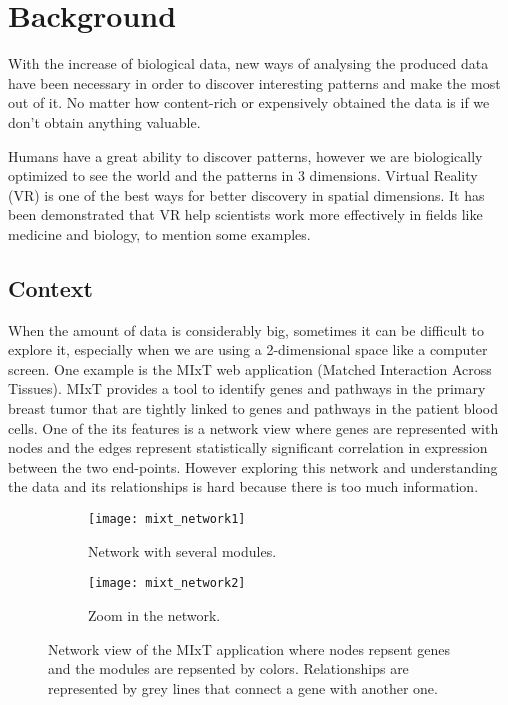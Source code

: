 \section{Background}
With the increase of biological data, new ways of analysing the produced data have been necessary in order to discover interesting patterns  and make the most out of it. No matter how content-rich or expensively obtained the data is if we don’t obtain anything valuable.

Humans have a great ability to discover patterns, however we are biologically optimized to see the world and the patterns in 3 dimensions. Virtual Reality (VR) is one of the best ways for better discovery in spatial dimensions. It has been demonstrated that VR help scientists work more effectively in fields like medicine \cite{Laver11}\cite{xia_ip_samman_wong_gateno_wang_yeung_kot_tideman_2001} and biology\cite{10.1093/bioinformatics/bti581}, to mention some examples.

\subsection{Context}
When the amount of data is considerably big, sometimes it can be difficult to explore it, especially when we are using a 2-dimensional space like a computer screen. One example is the MIxT web application (Matched Interaction Across Tissues)\cite{fjukstad_dumeaux_olsen_lund_hallett_bongo_2017}\cite{dumeaux_fjukstad_interactions_tumor_blood}. MIxT provides a tool to identify genes and pathways in the primary breast tumor that are tightly linked to genes and pathways in the patient blood cells\cite{dumeaux_fjukstad_interactions_tumor_blood}. One of the its features is a network view where genes are represented with nodes and the edges represent statistically significant correlation in expression between the two end-points. However exploring this network and understanding the data and its relationships is hard because there is too much information.

\begin{figure}[h!]
    \newlength{\tempheight}
    \setlength{\tempheight}{15ex}
    \centering%
    \begin{subfigure}[t]{0.5\textwidth}
        \centering%
        \texttt{[image: mixt\_network1]}
        \caption{Network with several modules.}
        \label{fig:mixt_network1}
    \end{subfigure}%
    \begin{subfigure}[t]{0.5\textwidth}
        \centering%
        \texttt{[image: mixt\_network2]}
        \caption{Zoom in the network.}
        \label{fig:mixt_network_zoom}
    \end{subfigure}

    \caption{Network view of the MIxT application where nodes repsent genes and the modules are repsented by colors. Relationships are represented by grey lines that connect a gene with another one.}
    \label{fig:mixt_network}
\end{figure}

